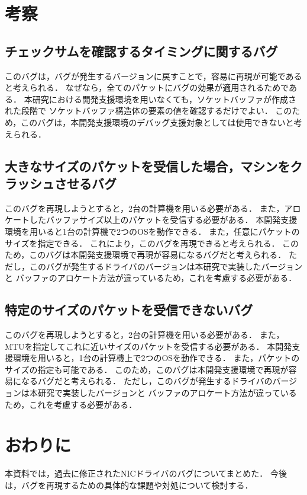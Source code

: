 \documentclass[12pt]{jsarticle}
\begin{document}
\section{考察}
\subsection{チェックサムを確認するタイミングに関するバグ}
このバグは，バグが発生するバージョンに戻すことで，容易に再現が可能であると考えられる．
なぜなら，全てのパケットにバグの効果が適用されるためである．
本研究における開発支援環境を用いなくても，ソケットバッファが作成された段階で
ソケットバッファ構造体の要素の値を確認するだけでよい．
このため，このバグは，本開発支援環境のデバッグ支援対象としては使用できないと考えられる．

\subsection{大きなサイズのパケットを受信した場合，マシンをクラッシュさせるバグ}
このバグを再現しようとすると，2台の計算機を用いる必要がある．
また，アロケートしたバッファサイズ以上のパケットを受信する必要がある．
本開発支援環境を用いると1台の計算機で2つのOSを動作できる．
また，任意にパケットのサイズを指定できる．
これにより，このバグを再現できると考えられる．
このため，このバグは本開発支援環境で再現が容易になるバグだと考えられる．
ただし，このバグが発生するドライバのバージョンは本研究で実装したバージョンと
バッファのアロケート方法が違っているため，これを考慮する必要がある．

\subsection{特定のサイズのパケットを受信できないバグ}
このバグを再現しようとすると，2台の計算機を用いる必要がある．
また，MTUを指定してこれに近いサイズのパケットを受信する必要がある．
本開発支援環境を用いると，1台の計算機上で2つのOSを動作できる．
また，パケットのサイズの指定も可能である．
このため，このバグは本開発支援環境で再現が容易になるバグだと考えられる．
ただし，このバグが発生するドライバのバージョンは本研究で実装したバージョンと
バッファのアロケート方法が違っているため，これを考慮する必要がある．

\section{おわりに}
本資料では，過去に修正されたNICドライバのバグについてまとめた．
今後は，バグを再現するための具体的な課題や対処について検討する．
\end{document}
